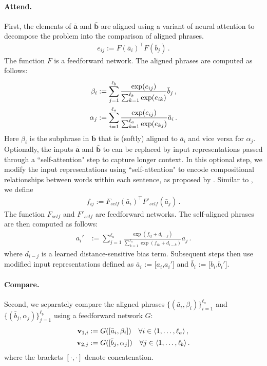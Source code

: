 \documentclass[11pt,letterpaper]{article}
\newcommand{\ab}{\mathbf{a}}
\newcommand{\bb}{\mathbf{b}}
\newcommand{\vb}{\mathbf{v}}
\begin{document}
\paragraph{Attend.}
First, the elements of $\bar{\ab}$ and $\bar{\bb}$ are aligned using a variant of neural attention \cite{bahdanau2014neural} to decompose the problem into the comparison of aligned phrases.
\begin{align}\label{eq:unnormalized_attention}
e_{ij} := F(\bar{a}_i)^\top F(\bar{b}_j)\,.
\end{align}
The function $F$ is a feedforward network.  The aligned phrases are computed as follows:
\begin{align}\label{eq:normalized_attention}
\beta_i &:= \sum_{j=1}^{\ell_b} \frac{\exp(e_{ij})}{\sum_{k=1}^{\ell_b} \exp(e_{ik})} \bar{b}_j\,,  \notag \\
\alpha_j &:= \sum_{i=1}^{\ell_a} \frac{\exp(e_{ij})}{\sum_{k=1}^{\ell_a} \exp(e_{kj})} \bar{a}_i\,.
\end{align}
Here $\beta_i$ is the subphrase in $\bar{\bb}$ that is (softly) aligned to $\bar{a}_i$ and vice versa for $\alpha_j$.
Optionally, the inputs $\bar{\ab}$ and $\bar{\bb}$ to  can be replaced by input representations passed through a ``self-attention" step to capture longer context.
In this optional step, we modify the input representations using ``self-attention" to encode compositional relationships between words within each sentence, as proposed by \cite{cheng-dong-lapata:2016:EMNLP2016}.
Similar to , we define
\begin{align}\label{eq:unnormalized_self_attention}
f_{ij} := F_{self}(\bar{a}_i)^\top F'_{self}(\bar{a}_j)\,.
\end{align}
The function $F_{self}$ and $F'_{self}$ are feedforward networks. The self-aligned phrases are then computed as follows:
\begin{align}\label{eq:normalized_slef_attention}
a_i' &:= \sum_{j=1}^{\ell_a} \frac{\exp(f_{ij} + d_{i-j})}{\sum_{k=1}^{\ell_a} \exp(f_{ik} + d_{i-k})} a_j\,.
\end{align}
where $d_{i-j}$ is a learned distance-sensitive bias term. Subsequent steps then use modified input representations defined as $\bar{a}_i$ := [$a_i$,$a_i'$] and $\bar{b}_i$ := [$b_i$,$b_i'$].
\paragraph{Compare.}  Second, we separately compare the aligned phrases $\{(\bar{a}_i, \beta_i)\}_{i=1}^{\ell_a}$ and $\{(\bar{b}_j, \alpha_j)\}_{j=1}^{\ell_b}$ using a feedforward network $G$:
\begin{align}
\vb_{1,i} &:= G([\bar{a}_i, \beta_i])\quad \forall i \in \langle 1,\ldots, \ell_a\rangle\,, \notag \\
\vb_{2,j} &:= G([\bar{b}_j, \alpha_j])\quad \forall j \in \langle 1,\ldots, \ell_b\rangle\,.
\label{eq:gdefine}
\end{align}
where the brackets $[\cdot, \cdot]$ denote concatenation. 
\end{document}
